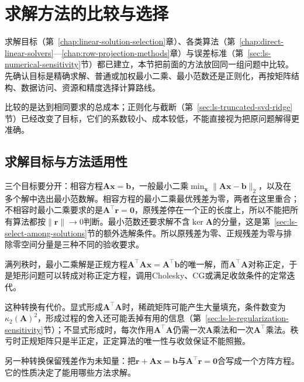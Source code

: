 \section{求解方法的比较与选择}
\label{sec:ls-method-selection}

求解目标（第~\ref{chap:linear-solution-selection}章）、各类算法（第~\ref{chap:direct-linear-solvers}—\ref{chap:row-projection-methods}章）与误差标准（第~\ref{sec:ls-numerical-sensitivity}节）都已建立，本节把前面的方法放回同一组问题中比较。先确认目标是精确求解、普通或加权最小二乘、最小范数还是正则化，再按矩阵结构、数据访问、资源和精度选择计算路线。

比较的是达到相同要求的总成本；正则化与截断（第~\ref{sec:ls-truncated-svd-ridge}节）已经改变了目标，它们的系数较小、成本较低，不能直接视为把原问题解得更准确。

\subsection{求解目标与方法适用性}
\label{sec:ls-method-selection-goals}

三个目标要分开：相容方程$\bm A\bm x=\bm b$，一般最小二乘$\min_{\bm x}\lVert\bm A\bm x-\bm b\rVert_2$，以及在多个解中选出最小范数解。相容方程的最小二乘最优残差为零，两者在这里重合；不相容时最小二乘要求的是$\bm A^\top\bm r=\bm0$，原残差停在一个正的长度上，所以不能把所有算法都按$\lVert\bm r\rVert\to0$判断。最小范数还要求解不含$\ker\bm A$的分量，这是第~\ref{sec:ls-select-among-solutions}节的额外选解条件。所以原残差为零、正规残差为零与排除零空间分量是三种不同的验收要求。

满列秩时，最小二乘解是正规方程$\bm A^\top\bm A\bm x=\bm A^\top\bm b$的唯一解，而$\bm A^\top\bm A$对称正定，于是矩形问题可以转成对称正定方程，调用Cholesky、CG或满足收敛条件的定常迭代。

这种转换有代价。显式形成$\bm A^\top\bm A$时，稀疏矩阵可能产生大量填充，条件数变为$\kappa_2(\bm A)^2$，形成过程的舍入还可能丢掉有用的信息（第~\ref{sec:ls-ls-regularization-sensitivity}节）；不显式形成时，每次作用$\bm A^\top\bm A$仍需一次$\bm A$乘法和一次$\bm A^\top$乘法。秩亏时正规矩阵只是半正定，正定算法的唯一性与收敛保证不能照搬。

另一种转换保留残差作为未知量：把$\bm r+\bm A\bm x=\bm b$与$\bm A^\top\bm r=\bm0$合写成一个方阵方程。它的性质决定了能用哪些方法求解。

